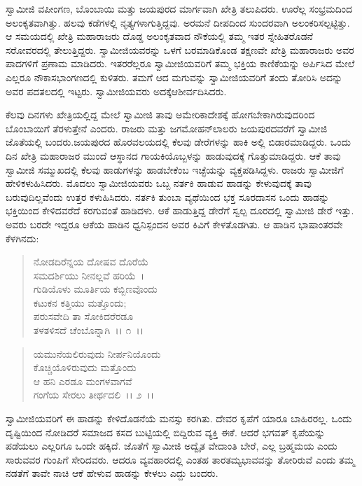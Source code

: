  ಸ್ವಾಮೀಜಿ ವಪೀಂಗಣ, ಬೊಂಬಾಯಿ ಮತ್ತು ಜಯಪುರದ ಮಾರ್ಗವಾಗಿ ಖೇತ್ರಿ ತಲುಪಿದರು. ಊರೆಲ್ಲ ಸಂಭ್ರಮದಿಂದ ಅಲಂಕೃತವಾಗಿತ್ತು. ಹಲವು ಕಡೆಗಳಲ್ಲಿ ನೃತ್ಯಗಳಾಗುತ್ತಿದ್ದವು. ಅರಮನೆ ದೀಪದಿಂದ ಸುಂದರವಾಗಿ ಅಲಂಕರಿಸಲ್ಪಟ್ಟಿತ್ತು. ಆ ಸಮಯದಲ್ಲಿ ಖೇತ್ರಿ ಮಹಾರಾಜರು ದೊಡ್ಡ ಅಲಂಕೃತವಾದ ನೌಕೆಯಲ್ಲಿ ತಮ್ಮ ಇತರ ಸ್ನೇಹಿತರೊಡನೆ ಸರೋವರದಲ್ಲಿ ತೇಲುತ್ತಿದ್ದರು. ಸ್ವಾಮೀಜಿಯವರನ್ನು ಒಳಗೆ ಬರಮಾಡಿಕೊಂಡ ತಕ್ಷಣವೇ ಖೇತ್ರಿ ಮಹಾರಾಜರು ಅವರ ಪಾದಗಳಿಗೆ ಪ್ರಣಾಮ ಮಾಡಿದರು. ಇತರರೆಲ್ಲರೂ ಸ್ವಾಮೀಜಿಯವರಿಗೆ ತಮ್ಮ ಭಕ್ತಿಯ ಕಾಣಿಕೆಯನ್ನು ಅರ್ಪಿಸಿದ ಮೇಲೆ ಎಲ್ಲರೂ ನೌಕಾಸಭಾಂಗಣದಲ್ಲಿ ಕುಳಿತರು. ತಮಗೆ ಆದ ಮಗುವನ್ನು ಸ್ವಾಮೀಜಿಯವರಿಗೆ ತಂದು ತೋರಿಸಿ ಅದನ್ನು ಅವರ ಪದತಲದಲ್ಲಿ ಇಟ್ಟರು. ಸ್ವಾಮೀಜಿಯವರು ಅದಕ್ಕೆ\break ಆಶೀರ್ವದಿಸಿದರು. 

 ಕೆಲವು ದಿನಗಳು ಖೇತ್ರಿಯಲ್ಲಿದ್ದ ಮೇಲೆ ಸ್ವಾಮೀಜಿ ತಾವು ಅಮೇರಿಕಾದೇಶಕ್ಕೆ ಹೋಗಬೇಕಾಗಿರುವುದರಿಂದ ಬೊಂಬಾಯಿಗೆ ತೆರಳುತ್ತೇನೆ ಎಂದರು. ರಾಜರು ಮತ್ತು ಜಗಮೋಹನ್‍ಲಾಲರು ಜಯಪುರದವರೆಗೆ ಸ್ವಾಮೀಜಿ ಜೊತೆಯಲ್ಲಿ ಬಂದರು.\break ಜಯಪುರದ ಹೊರವಲಯದಲ್ಲಿ ಕೆಲವು ಡೇರೆಗಳನ್ನು ಹಾಕಿ ಅಲ್ಲಿ ಬಿಡಾರಮಾಡಿದ್ದರು. ಒಂದು ದಿನ ಖೇತ್ರಿ ಮಹಾರಾಜರ ಮುಂದೆ ಆಸ್ಥಾನದ ಗಾಯಕಿಯೊಬ್ಬಳನ್ನು ಹಾಡುವುದಕ್ಕೆ ಗೊತ್ತುಮಾಡಿದ್ದರು. ಆಕೆ ತಾವು ಸ್ವಾಮೀಜಿ ಸಮ್ಮುಖದಲ್ಲಿ ಕೆಲವು ಹಾಡುಗಳನ್ನು ಹಾಡಬೇಕೆಂಬ ಇಚ್ಛೆಯನ್ನು ವ್ಯಕ್ತಪಡಿಸಿದ್ದಳು. ರಾಜರು ಸ್ವಾಮೀಜಿಗೆ ಹೇಳಿಕಳುಹಿಸಿದರು. ಮೊದಲು ಸ್ವಾಮೀಜಿಯವರು ಒಬ್ಬ ನರ್ತಕಿ ಹಾಡುವ ಹಾಡನ್ನು ಕೇಳುವುದಕ್ಕೆ ತಾವು ಬರುವುದಿಲ್ಲವೆಂದು ಉತ್ತರ ಕಳುಹಿಸಿದರು. ನರ್ತಕಿ ತುಂಬಾ ವ್ಯಥೆಯಿಂದ ಭಕ್ತ ಸೂರದಾಸನ ಒಂದು ಹಾಡನ್ನು ಭಕ್ತಿಯಿಂದ ಕೇಳಿದವರೆದೆ ಕರಗುವಂತೆ ಹಾಡಿದಳು. ಆಕೆ ಹಾಡುತ್ತಿದ್ದ ಡೇರೆಗೆ ಸ್ವಲ್ಪ ದೂರದಲ್ಲಿ ಸ್ವಾಮೀಜಿ ಡೇರೆ ಇತ್ತು. ಅವರು ಬರದೇ ಇದ್ದರೂ ಆಕೆಯ ಹಾಡಿನ ಧ್ವನಿಸ್ಪಂದನ ಅವರ ಕಿವಿಗೆ ಕೇಳತೊಡಗಿತು. ಆ ಹಾಡಿನ ಭಾಷಾಂತರವೇ ಕೆಳಗಿನದು:

\begin{verse}
ನೋಡದಿರೆನ್ನಯ ದೋಷವ ದೊರೆಯೆ\\ಸಮದರ್ಶಿಯು ನೀನಲ್ಲವೆ ಹರಿಯೆ~। \\ಗುಡಿಯೊಳು ಮೂರ್ತಿಯ ಕಬ್ಬಿಣವೊಂದು \\ಕಟುಕನ ಕತ್ತಿಯು ಮತ್ತೊಂದು;\\ಪರುಸವೇದಿ ತಾ ಸೋಕಿದರೆರಡೂ \\ತಳತಳಿಸದೆ ಚೆಂಬೊನ್ನಾಗಿ~।। ೧~।।
\end{verse}

\begin{verse}
ಯಮುನೆಯಲಿರುವುದು ನೀರ್ಪನಿಯೊಂದು \\ಕೊಚ್ಚಿಯೊಳಿರುವುದು ಮತ್ತೊಂದು\\ಆ ಹನಿ ಎರಡೂ ಮಂಗಳವಾಗವೆ\\ಗಂಗೆಯ ಸೇರಲು ತೀರ್ಥದಲಿ~।। ೨~।। 
\end{verse}

 ಸ್ವಾಮೀಜಿಯವರಿಗೆ ಈ ಹಾಡನ್ನು ಕೇಳಿದೊಡನೆಯೆ ಮನಸ್ಸು ಕರಗಿತು. ದೇವರ ಕೃಪೆಗೆ ಯಾರೂ ಬಾಹಿರರಲ್ಲ. ಒಂದು ದೃಷ್ಟಿಯಿಂದ ನೋಡಿದರೆ ಸಮಾಜದ ಕಸದ ಬುಟ್ಟಿಯಲ್ಲಿ ಬಿದ್ದಿರುವ ವ್ಯಕ್ತಿ ಈಕೆ. ಆದರೆ ಭಗವತ್ ಕೃಪೆಯನ್ನು ಪಡೆಯಲು ಎಲ್ಲರಿಗೂ ಒಂದೇ ಹಕ್ಕಿದೆ. ಜೊತೆಗೆ ಸ್ವಾಮೀಜಿ ಅದ್ವೈತ ವೇದಾಂತಿ ಬೇರೆ, ಎಲ್ಲ ಬ್ರಹ್ಮಮಯ ಎಂದು ಸಾರುವವರ ಗುಂಪಿಗೆ ಸೇರಿದವರು. ಆದರೂ ವ್ಯವಹಾರದಲ್ಲಿ ಎಂತಹ ತಾರತಮ್ಯಭಾವವನ್ನು ತೋರಿರುವೆ ಎಂದು ತಮ್ಮ ನಡತೆಗೆ ತಾವೇ ನಾಚಿ ಆಕೆ ಹೇಳುವ ಹಾಡನ್ನು ಕೇಳಲು ಎದ್ದು ಬಂದರು. 

